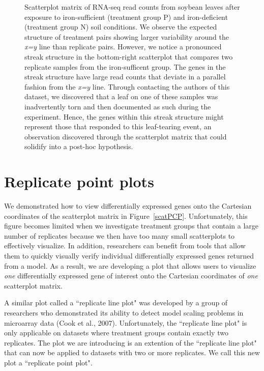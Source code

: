 \documentclass[useAMS,referee]{biom}
\begin{document}
\begin{figure}
\begin{center}
\centerline{}
\end{center}
\caption{Scatterplot matrix of RNA-seq read counts from soybean leaves after exposure to iron-sufficient (treatment group P) and iron-deficient (treatment group N) soil conditions. We observe the expected structure of treatment pairs showing larger variability around the \textit{x=y} line than replicate pairs. However, we notice a pronounced streak structure in the bottom-right scatterplot that compares two replicate samples from the iron-sufficent group. The genes in the streak structure have large read counts that deviate in a parallel fashion from the \textit{x=y} line. Through contacting the authors of this dataset, we discovered that a leaf on one of these samples was inadvertently torn and then documented as such during the experiment. Hence, the genes within this streak structure might represent those that responded to this leaf-tearing event, an observation discovered through the scatterplot matrix that could solidify into a post-hoc hypothesis.
\label{structure}}
\end{figure}

\section{Replicate point plots}
\label{s:repPoint}

We demonstrated how to view differentially expressed genes onto the Cartesian coordinates of the scatterplot matrix in Figure~\ref{scatPCP}. Unfortunately, this figure becomes limited when we investigate treatment groups that contain a large number of replicates because we then have too many small scatterplots to effectively visualize. In addition, researchers can benefit from tools that allow them to quickly visually verify individual differentially expressed genes returned from a model. As a result, we are developing a plot that allows users to visualize \textit{one} differentially expressed gene of interest onto the Cartesian coordinates of \textit{one} scatterplot matrix.

A similar plot called a ``replicate line plot" was developed by a group of researchers who demonstrated its ability to detect model scaling problems in microarray data (Cook et al., 2007). Unfortunately, the ``replicate line plot" is only applicable on datasets where treatment groups contain exactly two replicates. The plot we are introducing is an extention of the ``replicate line plot" that can now be applied to datasets with two or more replicates. We call this new plot a ``replicate point plot".
\end{document}
